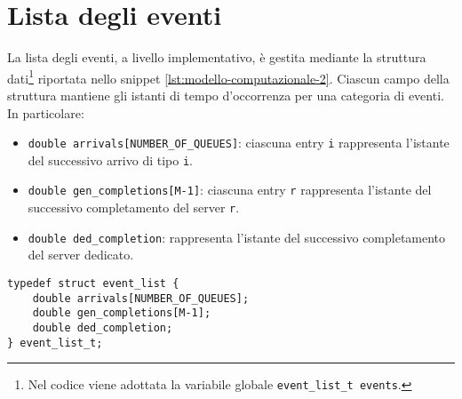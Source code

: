 \section{Lista degli eventi}\label{sec:modello-computazionale-lista-eventi}
La lista degli eventi, a livello implementativo, è gestita mediante la struttura dati\footnote{Nel codice viene adottata la variabile globale \texttt{{\color{code_purple}event\_list\_t} events}.} riportata nello snippet \ref{lst:modello-computazionale-2}.
Ciascun campo della struttura mantiene gli istanti di tempo d'occorrenza per una categoria di eventi. In particolare:
\begin{itemize}
\item \texttt{{\color{code_purple}double} arrivals[NUMBER\_OF\_QUEUES]}: ciascuna entry \texttt{i} rappresenta l'istante del successivo arrivo di tipo \texttt{i}.
\item \texttt{{\color{code_purple}double} gen\_completions[M-1]}: ciascuna entry \texttt{r} rappresenta l'istante del successivo completamento del server \texttt{r}.
\item \texttt{{\color{code_purple}double} ded\_completion}: rappresenta l'istante del successivo completamento del server dedicato.
\end{itemize}

\begin{lstlisting}[label={lst:modello-computazionale-2}, caption={Struttura dati per la lista degli eventi}]
typedef struct event_list {
    double arrivals[NUMBER_OF_QUEUES];  
    double gen_completions[M-1];               
    double ded_completion;                         
} event_list_t; 
\end{lstlisting}

